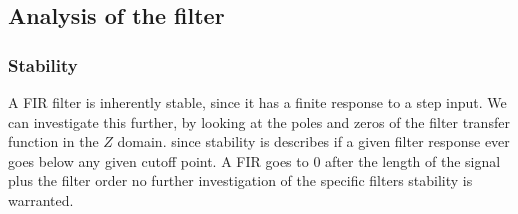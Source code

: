 
\subsection{Analysis of the filter}

\subsubsection{Stability}
A FIR filter is inherently stable, since it has a finite response to a step input. We can investigate this further, by looking at the poles and zeros of the filter transfer function in the $Z$ domain.
since stability is describes if a given filter response ever goes below any given cutoff point. A FIR  goes to 0 after the length of the signal  plus the filter order no further investigation of the specific filters stability is warranted.

